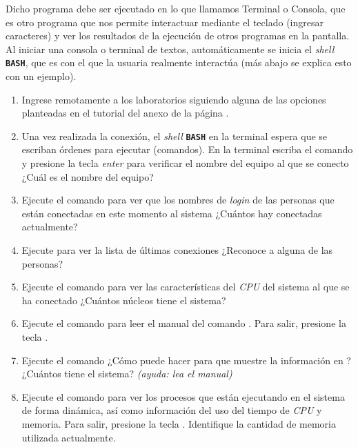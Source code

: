 \documentclass[12pt]{article}
\newcommand{\bash}{\textbf{\texttt{BASH}}}
\begin{document}
Dicho programa debe ser ejecutado en lo que llamamos Terminal o Consola, que
es otro programa que nos permite interactuar mediante el teclado (ingresar
caracteres) y ver los resultados de la ejecución de otros programas en la
pantalla. Al iniciar una consola o terminal de textos, automáticamente se
inicia el \emph{shell} \bash, que es con el que la usuaria realmente
interactúa (más abajo se explica esto con un ejemplo).

\begin{enumerate}

    \item Ingrese remotamente a los laboratorios siguiendo alguna de las
        opciones planteadas en el tutorial del anexo de la página
        \pageref{sec:anexoConexion}.
        
    \item Una vez realizada la conexión, el \emph{shell} \bash{} en la
        terminal espera que se escriban órdenes para ejecutar (comandos). En
        la terminal escriba el comando  y presione la tecla
        \emph{enter} para verificar el nombre del equipo al que se conecto
        ¿Cuál es el nombre del equipo?

    \item Ejecute el comando  para ver que los nombres de \emph{login}
        de las personas que están conectadas en este momento al sistema ¿Cuántos
        hay conectadas actualmente?

    \item Ejecute  para ver la lista de últimas conexiones
        ¿Reconoce a alguna de las personas?

    \item Ejecute el comando  para ver las características del
        \emph{CPU} del sistema al que se ha conectado ¿Cuántos núcleos tiene
        el sistema?

    \item Ejecute el comando  para leer el manual del comando
        . Para salir, presione la tecla .

    \item Ejecute el comando  ¿Cómo puede hacer para que muestre la
        información en ? ¿Cuántos  tiene el sistema?
        \emph{(ayuda: lea el manual)}

    \item Ejecute el comando  para ver los procesos que están
        ejecutando en el sistema de forma dinámica, así como información del
        uso del tiempo de \emph{CPU} y memoria. Para salir, presione la tecla
        . Identifique la cantidad de memoria utilizada actualmente.


\end{enumerate}
\end{document}

